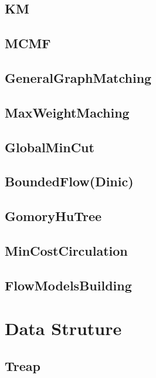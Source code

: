 \subsection{KM}

\subsection{MCMF}

\subsection{GeneralGraphMatching}

\subsection{MaxWeightMaching}

\subsection{GlobalMinCut}

\subsection{BoundedFlow(Dinic)}

\subsection{GomoryHuTree}

\subsection{MinCostCirculation}

\subsection{FlowModelsBuilding}

\section{Data Struture}
\subsection{Treap}

